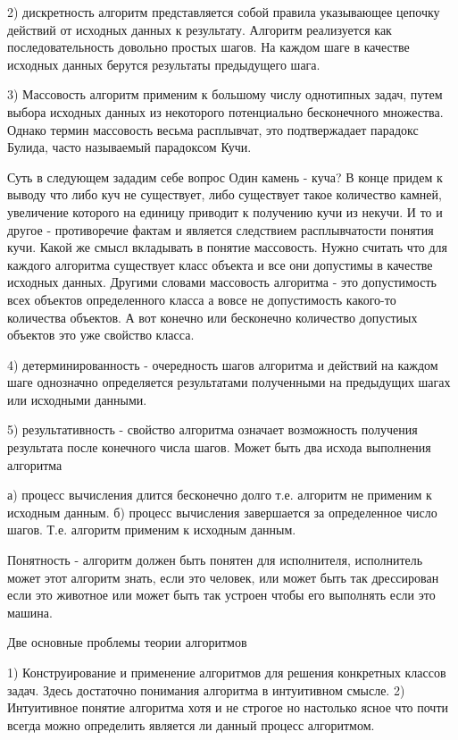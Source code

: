 2) дискретность алгоритм представляется собой правила указывающее цепочку действий от исходных данных к результату.
Алгоритм реализуется как последовательность довольно простых шагов. На каждом шаге в качестве исходных данных берутся результаты предыдущего шага.

3) Массовость алгоритм применим к большому числу однотипных задач, путем выбора исходных данных из некоторого потенциально бесконечного множества. Однако термин массовость весьма расплывчат, это подтвержадает парадокс Булида, часто называемый парадоксом Кучи.

Суть в следующем зададим себе вопрос Один камень - куча? В конце придем к выводу что либо куч не существует, либо существует такое количество камней, увеличение которого на единицу приводит к получению кучи из некучи. И то и другое - противоречие фактам и является следствием расплывчатости понятия кучи. Какой же смысл вкладывать в понятие массовость. Нужно считать что для каждого алгоритма существует класс объекта и все они допустимы в качестве исходных данных. Другими словами массовость алгоритма - это допустимость всех объектов определенного класса а вовсе не допустимость какого-то количества объектов. А вот конечно или бесконечно количество допустиых объектов это уже свойство класса.

4) детерминированность - очередность шагов алгоритма и действий на каждом шаге однозначно определяется результатами полученными на предыдущих шагах или исходными данными.

5) результативность - свойство алгоритма означает возможность получения результата после конечного числа шагов. Может быть два исхода выполнения алгоритма

а) процесс вычисления длится бесконечно долго т.е. алгоритм не применим к исходным данным.
б) процесс вычисления завершается за определенное число шагов. Т.е. алгоритм применим к исходным данным.

Понятность - алгоритм должен быть понятен для исполнителя, исполнитель может этот алгоритм знать, если это человек, или может быть так дрессирован если это животное или может быть так устроен чтобы его выполнять если это машина.

Две основные проблемы теории алгоритмов

1) Конструирование и применение алгоритмов для решения конкретных классов задач. Здесь достаточно понимания алгоритма в интуитивном смысле.
2) Интуитивное понятие алгоритма хотя и не строгое но настолько ясное что почти всегда можно определить является ли данный процесс алгоритмом.

